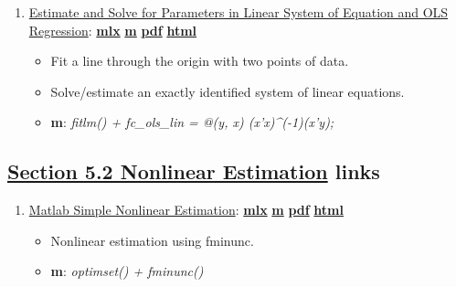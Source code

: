\documentclass[
]{book}
\providecommand{\tightlist}{%
  \setlength{\itemsep}{0pt}\setlength{\parskip}{0pt}}
\begin{document}
\begin{enumerate}
\def\labelenumi{\arabic{enumi}.}
\tightlist
\item
  \href{https://fanwangecon.github.io/M4Econ/estimation/linear/htmlpdfm/fs_linear_ols.html}{Estimate and Solve for Parameters in Linear System of Equation and OLS Regression}: \href{https://github.com/FanWangEcon/M4Econ/blob/master/estimation/linear/fs_linear_ols.mlx}{\textbf{mlx}} \textbar{} \href{https://github.com/FanWangEcon/M4Econ/blob/master/estimation/linear/htmlpdfm/fs_linear_ols.m}{\textbf{m}} \textbar{} \href{https://github.com/FanWangEcon/M4Econ/blob/master/estimation/linear/htmlpdfm/fs_linear_ols.pdf}{\textbf{pdf}} \textbar{} \href{https://fanwangecon.github.io/M4Econ/estimation/linear/htmlpdfm/fs_linear_ols.html}{\textbf{html}}

  \begin{itemize}
  \tightlist
  \item
    Fit a line through the origin with two points of data.
  \item
    Solve/estimate an exactly identified system of linear equations.
  \item
    \textbf{m}: \emph{fitlm() + fc\_ols\_lin = @(y, x) (x'x)\^{}(-1)(x'y);}
  \end{itemize}
\end{enumerate}

\hypertarget{section-5.2-nonlinear-estimationnonlinear-estimation-links}{%
\subsection{\texorpdfstring{\protect\hyperlink{nonlinear-estimation}{Section 5.2 Nonlinear Estimation} links}{Section 5.2 Nonlinear Estimation links}}\label{section-5.2-nonlinear-estimationnonlinear-estimation-links}}

\begin{enumerate}
\def\labelenumi{\arabic{enumi}.}
\tightlist
\item
  \href{https://fanwangecon.github.io/M4Econ/estimation/nonlinear/htmlpdfm/fs_nonlinear_explog.html}{Matlab Simple Nonlinear Estimation}: \href{https://github.com/FanWangEcon/M4Econ/blob/master/estimation/nonlinear/fs_nonlinear_explog.mlx}{\textbf{mlx}} \textbar{} \href{https://github.com/FanWangEcon/M4Econ/blob/master/estimation/nonlinear/htmlpdfm/fs_nonlinear_explog.m}{\textbf{m}} \textbar{} \href{https://github.com/FanWangEcon/M4Econ/blob/master/estimation/nonlinear/htmlpdfm/fs_nonlinear_explog.pdf}{\textbf{pdf}} \textbar{} \href{https://fanwangecon.github.io/M4Econ/estimation/nonlinear/htmlpdfm/fs_nonlinear_explog.html}{\textbf{html}}

  \begin{itemize}
  \tightlist
  \item
    Nonlinear estimation using fminunc.
  \item
    \textbf{m}: \emph{optimset() + fminunc()}
  \end{itemize}
\end{enumerate}
\end{document}
